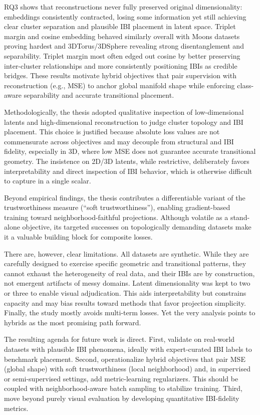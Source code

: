 RQ3 shows that reconstructions never fully preserved original dimensionality: embeddings consistently contracted, losing some information yet still achieving clear cluster separation and plausible IBI placement in latent space. Triplet margin and cosine embedding behaved similarly overall with Moons datasets proving hardest and 3DTorus/3DSphere revealing strong disentanglement and separability. Triplet margin most often edged out cosine by better preserving inter-cluster relationships and more consistently positioning IBIs as credible bridges. These results motivate hybrid objectives that pair supervision with reconstruction (e.g., MSE) to anchor global manifold shape while enforcing class-aware separability and accurate transitional placement.

Methodologically, the thesis adopted qualitative inspection of low-dimensional latents and high-dimensional reconstruction to judge cluster topology and IBI placement. This choice is justified because absolute loss values are not commensurate across objectives and may decouple from structural and IBI fidelity, especially in 3D, where low MSE does not guarantee accurate transitional geometry. The insistence on 2D/3D latents, while restrictive, deliberately favors interpretability and direct inspection of IBI behavior, which is otherwise difficult to capture in a single scalar.

Beyond empirical findings, the thesis contributes a differentiable variant of the trustworthiness measure (“soft trustworthiness”), enabling gradient-based training toward neighborhood-faithful projections. Although volatile as a stand-alone objective, its targeted successes on topologically demanding datasets make it a valuable building block for composite losses.

There are, however, clear limitations. All datasets are synthetic. While they are carefully designed to exercise specific geometric and transitional patterns, they cannot exhaust the heterogeneity of real data, and their IBIs are by construction, not emergent artifacts of messy domains. Latent dimensionality was kept to two or three to enable visual adjudication. This aids interpretability but constrains capacity and may bias results toward methods that favor projection simplicity. Finally, the study mostly avoids multi-term losses. Yet the very analysis points to hybrids as the most promising path forward.

The resulting agenda for future work is direct. First, validate on real-world datasets with plausible IBI phenomena, ideally with expert-curated IBI labels to benchmark placement. Second, operationalize hybrid objectives that pair MSE (global shape) with soft trustworthiness (local neighborhood) and, in supervised or semi-supervised settings, add metric-learning regularizers. This should be coupled with neighborhood-aware batch sampling to stabilize training. Third, move beyond purely visual evaluation by developing quantitative IBI-fidelity metrics.

